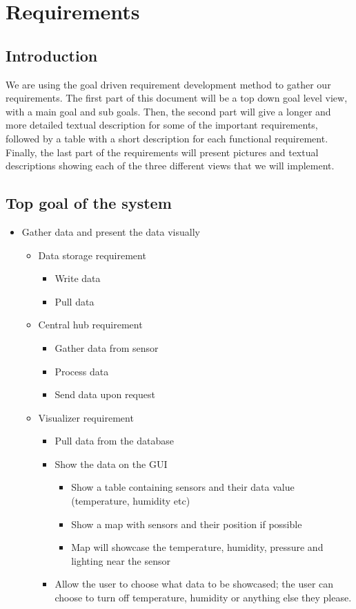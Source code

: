 \documentclass[../document]{subfiles}
\begin{document}
\section{Requirements}
\subsection{Introduction}
We are using the goal driven requirement development method to gather our requirements. The first part of this document will be a top down goal level view, with a main goal and sub goals. Then, the second part will give a longer and more detailed textual description for some of the important requirements, followed by a table with a short description for each functional requirement. Finally, the last part of the requirements will present pictures and textual descriptions showing each of the three different views that we will implement.

\subsection{Top goal of the system}
\begin{itemize}
\item
Gather data and present the data visually
\begin{itemize}
\item
Data storage requirement
\begin{itemize}
\item
Write data
\item
Pull data
\end{itemize}
\item
Central hub requirement
\begin{itemize}
\item
Gather data from sensor
\item
Process data
\item
Send data upon request
\end{itemize}
\item
Visualizer requirement
\begin{itemize}
\item
Pull data from the database
\item
Show the data on the GUI
\begin{itemize}
\item
Show a table containing sensors and their data value (temperature, humidity etc)
\item
Show a map with sensors and their position if possible
\item
Map will showcase the temperature, humidity, pressure and lighting near the sensor
\end{itemize}
\item
Allow the user to choose what data to be showcased; the user can choose to turn off temperature, humidity or anything else they please.
\end{itemize}
\end{itemize}
\end{itemize}
\end{document}
